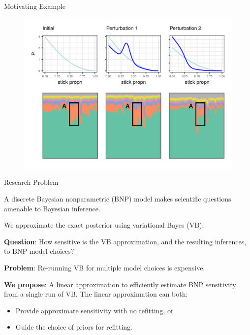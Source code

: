 \begin{frame}{Motivating Example}

\begin{figure}[!h]
\centering
\includegraphics[width = \textwidth]{./figure/mbololo_motivating_ex-1.png}
\end{figure}

\end{frame}



\begin{frame}{Research Problem}

A discrete Bayesian nonparametric (BNP) model makes scientific
questions amenable to Bayesian inference.

\pause

We approximate the exact posterior using variational Bayes (VB).

\pause

\textbf{Question}: How sensitive is the VB approximation, and the resulting
inferences, to BNP model choices?

\pause

\textbf{Problem}: Re-running VB for multiple model choices is expensive.

\pause

\textbf{We propose}: A linear approximation to efficiently
estimate BNP sensitivity from a single run of VB.  The linear approximation
can both:
\begin{itemize}
    \item Provide approximate sensitivity with no refitting, or
    \item Guide the choice of priors for refitting.
\end{itemize}

\end{frame}



